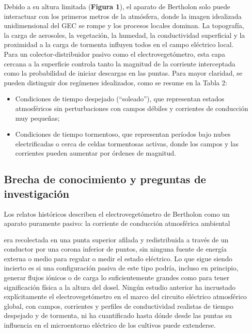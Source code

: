 \documentclass[
]{article}
\begin{document}
Debido a su altura limitada (\textbf{Figura 1}), el aparato de Bertholon
solo puede interactuar con los primeros metros de la atmósfera, donde la
imagen idealizada unidimensional del GEC se rompe y los procesos locales
dominan. La topografía, la carga de aerosoles, la vegetación, la
humedad, la conductividad superficial y la proximidad a la carga de
tormenta influyen todos en el campo eléctrico local. Para un
colector-distribuidor pasivo como el electrovegetómetro, esta capa
cercana a la superficie controla tanto la magnitud de la corriente
interceptada como la probabilidad de iniciar descargas en las puntas.
Para mayor claridad, se pueden distinguir dos regímenes idealizados,
como se resume en la Tabla 2:

\begin{itemize}
\item
  Condiciones de tiempo despejado (``soleado''), que representan estados
  atmosféricos sin perturbaciones con campos débiles y corrientes de
  conducción muy pequeñas;
\item
  Condiciones de tiempo tormentoso, que representan períodos bajo nubes
  electrificadas o cerca de celdas tormentosas activas, donde los campos
  y las corrientes pueden aumentar por órdenes de magnitud.
\end{itemize}

\subsection{Brecha de conocimiento y preguntas de
investigación}\label{brecha-de-conocimiento-y-preguntas-de-investigaciuxf3n}

Los relatos históricos describen el electrovegetómetro de Bertholon como
un aparato puramente pasivo: la corriente de conducción atmosférica
ambiental

era recolectada en una punta superior afilada y redistribuida a través
de un conductor por una corona inferior de puntos, sin ninguna fuente de
energía externa o medio para regular o medir el estado eléctrico. Lo que
sigue siendo incierto es si una configuración pasiva de este tipo
podría, incluso en principio, generar flujos iónicos o de carga lo
suficientemente grandes como para tener significación física a la altura
del dosel. Ningún estudio anterior ha incrustado explícitamente el
electrovegetómetro en el marco del circuito eléctrico atmosférico
global, con campos, corrientes y perfiles de conductividad realistas de
tiempo despejado y de tormenta, ni ha cuantificado hasta dónde desde las
puntas su influencia en el microentorno eléctrico de los cultivos puede
extenderse.
\end{document}
